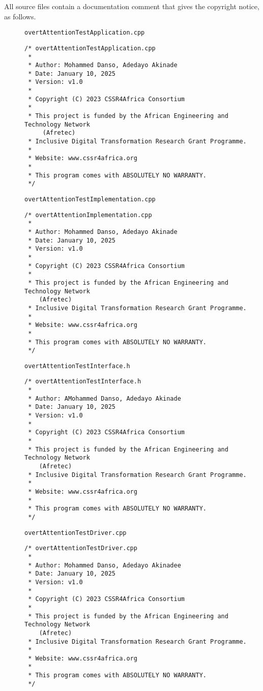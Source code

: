 \documentclass{CSSRforAfrica}
\newcommand{\blank}{~\\}
\newcommand{\checkboxChecked}{\fbox{\ding{51}}} %
\begin{document}
\noindent All source files contain a documentation comment that gives the copyright notice, as follows.
 
\begin{description}

\item[\checkboxChecked] {\small \verb+overtAttentionTestApplication.cpp+}  
{\small \begin{verbatim}
/* overtAttentionTestApplication.cpp
 *
 * Author: Mohammed Danso, Adedayo Akinade
 * Date: January 10, 2025
 * Version: v1.0
 * 
 * Copyright (C) 2023 CSSR4Africa Consortium
 * 
 * This project is funded by the African Engineering and Technology Network 
     (Afretec) 
 * Inclusive Digital Transformation Research Grant Programme. 
 *
 * Website: www.cssr4africa.org
 *
 * This program comes with ABSOLUTELY NO WARRANTY.
 */
\end{verbatim} }

\newpage
\item[\checkboxChecked]  {\small \verb+overtAttentionTestImplementation.cpp+}  
{\small \begin{verbatim}
/* overtAttentionImplementation.cpp
 *
 * Author: Mohammed Danso, Adedayo Akinade
 * Date: January 10, 2025
 * Version: v1.0
 * 
 * Copyright (C) 2023 CSSR4Africa Consortium
 * 
 * This project is funded by the African Engineering and Technology Network
    (Afretec) 
 * Inclusive Digital Transformation Research Grant Programme. 
 *
 * Website: www.cssr4africa.org
 *
 * This program comes with ABSOLUTELY NO WARRANTY.
 */
\end{verbatim} }

\item[\checkboxChecked] {\small \verb+overtAttentionTestInterface.h+}   
{\small \begin{verbatim}
/* overtAttentionTestInterface.h
 *
 * Author: AMohammed Danso, Adedayo Akinade
 * Date: January 10, 2025
 * Version: v1.0
 * 
 * Copyright (C) 2023 CSSR4Africa Consortium
 * 
 * This project is funded by the African Engineering and Technology Network
    (Afretec) 
 * Inclusive Digital Transformation Research Grant Programme. 
 *
 * Website: www.cssr4africa.org
 *
 * This program comes with ABSOLUTELY NO WARRANTY.
 */
\end{verbatim} }

\newpage
\item[\checkboxChecked] {\small \verb+overtAttentionTestDriver.cpp+}  
{\small \begin{verbatim}
/* overtAttentionTestDriver.cpp
 *
 * Author: Mohammed Danso, Adedayo Akinadee
 * Date: January 10, 2025
 * Version: v1.0
 * 
 * Copyright (C) 2023 CSSR4Africa Consortium
 * 
 * This project is funded by the African Engineering and Technology Network
    (Afretec) 
 * Inclusive Digital Transformation Research Grant Programme. 
 *
 * Website: www.cssr4africa.org
 *
 * This program comes with ABSOLUTELY NO WARRANTY.
 */
\end{verbatim} }

\end{description} 
%
\end{document}

